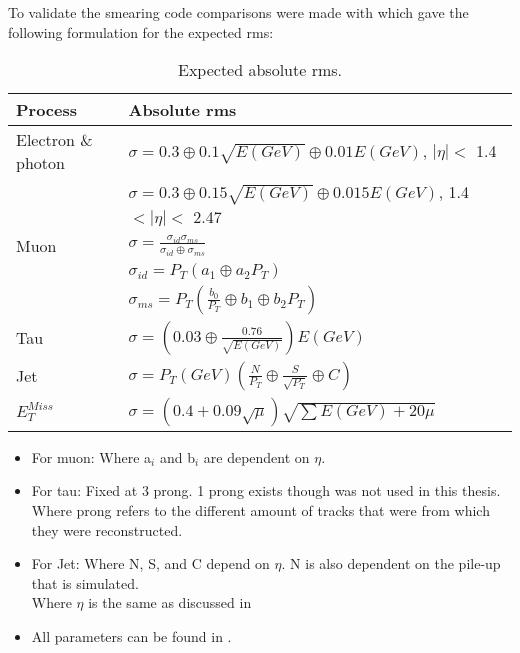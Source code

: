 To validate the smearing code comparisons were made with \citep{ATL-PHYS-PUB-2013-004} which gave the following formulation for the expected rms: 
\begin{table}[H]
\renewcommand{\arraystretch}{1.5} %
\begin{center}
\begin{tabular}{|l|l|}
\hline
Process & Absolute rms \\ \hline
Electron \& photon & $\sigma=0.3\oplus 0.1\sqrt{E(GeV)}\oplus 0.01E(GeV)$, $|\eta|<$ 1.4 \\
& $\sigma=0.3\oplus 0.15\sqrt{E(GeV)}\oplus 0.015E(GeV)$, 1.4 $<|\eta|<$ 2.47 \\ \hline 
Muon & $\sigma=\frac{\sigma_{id} \sigma_{ms}}{\sigma_{id} \oplus \sigma_{ms}}$\\
& $\sigma_{id}=P_T(a_1 \oplus a_2 P_T)$\\
& $\sigma_{ms}=P_T(\frac{b_0}{P_T} \oplus b_1 \oplus b_2 P_T)$\\ \hline
Tau & $\sigma =(0.03\oplus \frac{0.76}{\sqrt{E(GeV)}})E(GeV)$ \\ \hline
Jet & $\sigma = P_T(GeV)(\frac{N}{P_T} \oplus \frac{S}{\sqrt{P_T}} \oplus C)$ \\ \hline
$E_T^{Miss}$ & $\sigma = (0.4+0.09\sqrt{\mu})\sqrt{\sum E(GeV)+20\mu}$ \\ \hline
\end{tabular}
\end{center}
\renewcommand{\arraystretch}{1.0} %
\caption{Expected absolute rms.}
\label{tab:expected rms}
\end{table}
\begin{itemize}
\item For muon: Where a$_i$ and b$_i$ are dependent on $\eta$.
\item For tau: Fixed at 3 prong. 1 prong exists though was not used in this thesis. \\
Where prong refers to the different amount of tracks that were from which they were reconstructed.
\item For Jet: Where N, S, and C depend on $\eta$. N is also dependent on the pile-up that is simulated.\\
Where $\eta$ is the same as discussed in 
\item All parameters can be found in \citep{ATL-PHYS-PUB-2013-004}.
\end{itemize}
